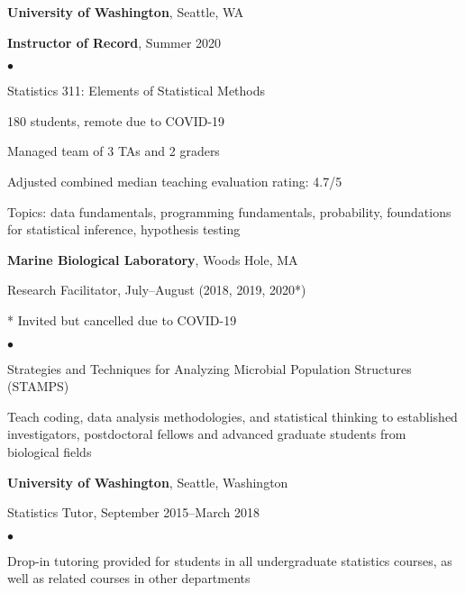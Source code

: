 \documentclass[margin,centered]{res}
\newenvironment{list1}{
  \begin{list}{\ding{113}}{%
      \setlength{\itemsep}{0in}
      \setlength{\parsep}{0in} \setlength{\parskip}{0in}
      \setlength{\topsep}{0in} \setlength{\partopsep}{0in}
      \setlength{\leftmargin}{0.17in}}}{\end{list}}
\newenvironment{list2}{
  \begin{list}{$\bullet$}{%
      \setlength{\itemsep}{0in}
      \setlength{\parsep}{0in} \setlength{\parskip}{0in}
      \setlength{\topsep}{0in} \setlength{\partopsep}{0in}
      \setlength{\leftmargin}{0.2in}}}{\end{list}}
\begin{document}
\begin{resume}
{\bf University of Washington}, Seattle, WA
\begin{list1}
\item[] \textbf{Instructor of Record}, Summer 2020
\begin{list2}
\vspace*{.05in}
\item Statistics 311: Elements of Statistical Methods
\item \raisebox{.1em}{$\scriptstyle\mathtt{\sim}$}180 students, remote due to COVID-19
\item Managed team of 3 TAs and 2 graders
\item Adjusted combined median teaching evaluation rating: 4.7/5
\item Topics: data fundamentals, programming fundamentals, probability, foundations for statistical inference, hypothesis testing
\end{list2}
\end{list1}



{\bf Marine Biological Laboratory}, Woods Hole, MA
\begin{list1}
\item[] Research Facilitator, July--August (2018, 2019, 2020*)
\item[] * Invited but cancelled due to COVID-19
\begin{list2}
\vspace*{.05in}
\item Strategies and Techniques for Analyzing Microbial Population Structures (STAMPS)
\item Teach coding, data analysis methodologies, and statistical thinking to established investigators, postdoctoral fellows and advanced graduate students from biological fields
\end{list2}
\end{list1}

{\bf University of Washington}, Seattle, Washington
\begin{list1}
\item[] Statistics Tutor, September 2015--March 2018
\begin{list2}
\vspace*{.05in}
\item Drop-in tutoring provided for students in all undergraduate statistics courses, as well as related courses in other departments
\end{list2}
\end{list1}


\end{resume}
\end{document}
